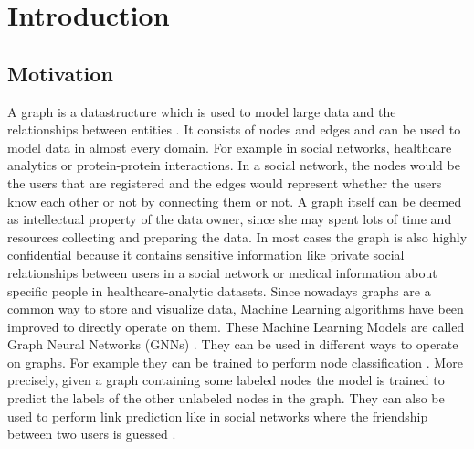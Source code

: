 \chapter{Introduction}


	\section{Motivation}
		A graph is a datastructure which is used to model large data and the relationships between entities \cite{DBLP:journals/corr/abs-2005-00687, cook2006mining}.
		It consists of nodes and edges and can be used to model data in almost every domain.
		For example in social networks, healthcare analytics or protein-protein interactions.
		In a social network, the nodes would be the users that are registered and the edges would represent whether the users know each other or not by connecting them or not.
		A graph itself can be deemed as intellectual property of the data owner, since she may spent lots of time and resources collecting and preparing the data.
		In most cases the graph is also highly confidential because it contains sensitive information like private social relationships between users in a social network or medical information about specific people in healthcare-analytic datasets.
		Since nowadays graphs are a common way to store and visualize data, Machine Learning algorithms have been improved to directly operate on them.
		These Machine Learning Models are called Graph Neural Networks (GNNs) \cite{atwood2016diffusionconvolutional, defferrard2017convolutional}.
		They can be used in different ways to operate on graphs.
		For example they can be trained to perform node classification \cite{kipf2017semisupervised}.
		More precisely, given a graph containing some labeled nodes the model is trained to predict the labels of the other unlabeled nodes in the graph.
		They can also be used to perform link prediction like in social networks where the friendship between two users is guessed \cite{zhang2018link}.

